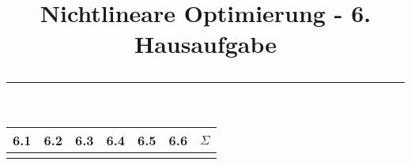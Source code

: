 \documentclass[11p,a4paper]{article}
\begin{document}
\title{\textbf{Nichtlineare Optimierung - 6. Hausaufgabe} \\ \rule{\textwidth}{1pt}}
\date{}

\clearpage\maketitle
\thispagestyle{empty}
\ourtitle
\setcounter{page}{0}


\vspace{2.5cm}
\begin{center}
\huge
\begin{tabular}{c*{5}{|c}||c}
6.1 & 6.2 & 6.3 & 6.4 & 6.5 & 6.6 & $\Sigma$ \\\hline
&&&&&& \\
\end{tabular}
\end{center}
\vspace{2cm}







%
\end{document}
